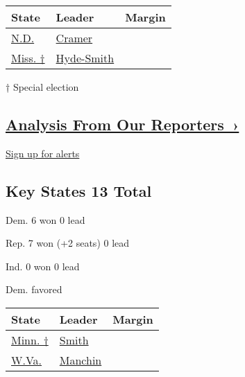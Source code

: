 \begin{longtable}[]{@{}lll@{}}
\toprule
State & Leader & Margin\tabularnewline
\midrule
\endhead
\href{https://www.nytimes3xbfgragh.onion/elections/results/north-dakota-senate}{N.D.}
&
\href{https://www.nytimes3xbfgragh.onion/elections/results/north-dakota-senate}{Cramer}
&
\href{https://www.nytimes3xbfgragh.onion/elections/results/north-dakota-senate}{}\tabularnewline
\href{https://www.nytimes3xbfgragh.onion/interactive/2018/11/27/us/elections/results-mississippi-senate-runoff-special-election.html}{Miss.
†} &
\href{https://www.nytimes3xbfgragh.onion/interactive/2018/11/27/us/elections/results-mississippi-senate-runoff-special-election.html}{Hyde-Smith}
&
\href{https://www.nytimes3xbfgragh.onion/interactive/2018/11/27/us/elections/results-mississippi-senate-runoff-special-election.html}{}\tabularnewline
\bottomrule
\end{longtable}

† Special election

\hypertarget{analysis-from-our-reporters-}{%
\subsection{\texorpdfstring{\href{https://www.nytimes3xbfgragh.onion/interactive/2018/11/06/us/elections/live-midterm-election-analysis-updates.html}{Analysis
From Our
Reporters~›}}{Analysis From Our Reporters~›}}\label{analysis-from-our-reporters-}}

\protect\hyperlink{}{Sign up for alerts}

\hypertarget{key-states-13-total-1}{%
\subsection{Key States 13 Total}\label{key-states-13-total-1}}

Dem. 6 won 0 lead

Rep. 7 won (+2 seats) 0 lead

Ind. 0 won 0 lead

Dem. favored

\begin{longtable}[]{@{}lll@{}}
\toprule
State & Leader & Margin\tabularnewline
\midrule
\endhead
\href{https://www.nytimes3xbfgragh.onion/elections/results/minnesota-senate-special}{Minn.
†} &
\href{https://www.nytimes3xbfgragh.onion/elections/results/minnesota-senate-special}{Smith}
&
\href{https://www.nytimes3xbfgragh.onion/elections/results/minnesota-senate-special}{}\tabularnewline
\href{https://www.nytimes3xbfgragh.onion/elections/results/west-virginia-senate}{W.Va.}
&
\href{https://www.nytimes3xbfgragh.onion/elections/results/west-virginia-senate}{Manchin}
&
\href{https://www.nytimes3xbfgragh.onion/elections/results/west-virginia-senate}{}\tabularnewline
\bottomrule
\end{longtable}

